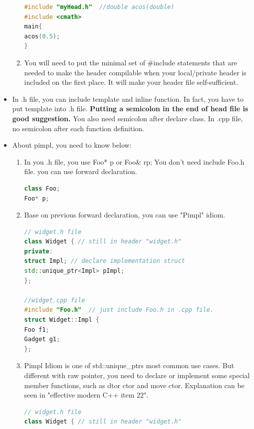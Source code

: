 \documentclass[a4paper,12pt,twoside]{book}
\begin{document}
\begin{itemize}
\begin{enumerate}
\begin{lstlisting}[frame=single, language=c++]
#include "myHead.h"  //double acos(double)
#include <cmath>
main{
acos(0.5);
}
\end{lstlisting}

\item You will need to put the minimal set of \#include statements that are needed to make the header compilable when your local/private header is included on the first place.  It will make your header file self-sufficient.
\end{enumerate}

\item In .h file, you can include template and inline function.  In fact, you have to put template into .h file. \textbf{Putting a semicolon in the end of head file is good suggestion.} You also need semicolon after declare class. In .cpp file, no semicolon after each function definition.

\item About pimpl, you need to know below:

\begin{enumerate}

\item In you .h file, you use Foo* p or Foo\& rp; You don't need include Foo.h file. you can use forward declaration.
\begin{lstlisting}[frame=single, language=c++]
class Foo;
Foo* p;
\end{lstlisting}

\item Base on previous forward declaration, you can use "Pimpl" idiom.
\begin{lstlisting}[frame=single, language=c++]
// widget.h file
class Widget { // still in header "widget.h"
private:
struct Impl; // declare implementation struct
std::unique_ptr<Impl> pImpl;
};

//widget.cpp file
#include "Foo.h"  // just include Foo.h in .cpp file.
struct Widget::Impl {
Foo f1;
Gadget g1;
};
\end{lstlisting}


\item   Pimpl Idiom is one of std::unique\_ptrs most common use cases. But different with raw pointer,  you need to declare or implement some special member functions, such as dtor ctor and move ctor. Explanation can be seen in "effective modern C++ item 22". 
\begin{lstlisting}[frame=single, language=c++, mathescape=true]
// widget.h file
class Widget { // still in header "widget.h"


\end{lstlisting}
\end{enumerate}
\end{itemize}
\end{document}
